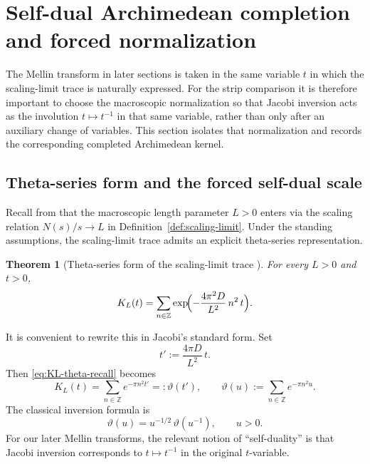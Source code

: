 \documentclass[11pt]{amsart}
\newtheorem{theorem}{Theorem}[section]
\theoremstyle{definition}
\theoremstyle{remark}
\newcommand{\Z}{\mathbb{Z}}
\begin{document}
\section{Self-dual Archimedean completion and forced normalization}
\label{sec:completion-selfdual}

The Mellin transform in later sections is taken in the same variable $t$ in which the scaling-limit
trace is naturally expressed.  For the strip comparison it is therefore important to choose the
macroscopic normalization so that Jacobi inversion acts as the involution $t\mapsto t^{-1}$ in
that same variable, rather than only after an auxiliary change of variables.  This section isolates
that normalization and records the corresponding completed Archimedean kernel.

\subsection{Theta-series form and the forced self-dual scale}

Recall from \cite{PaperI} that the macroscopic length parameter $L>0$ enters via the scaling relation
$N(s)/s\to L$ in Definition~\ref{def:scaling-limit}.  Under the standing assumptions, the
scaling-limit trace admits an explicit theta-series representation.

\begin{theorem}[Theta-series form of the scaling-limit trace {\cite[Theorem~X]{PaperI}}]
\label{thm:theta-series-form-recall}
For every $L>0$ and $t>0$,
\begin{equation}\label{eq:KL-theta-recall}
K_L(t)=\sum_{n\in\Z}\exp\!\Bigl(-\frac{4\pi^2D}{L^2}\,n^2\,t\Bigr).
\end{equation}
\end{theorem}

It is convenient to rewrite this in Jacobi's standard form.  Set
\begin{equation}\label{eq:tprime}
t' := \frac{4\pi D}{L^2}\,t.
\end{equation}
Then \eqref{eq:KL-theta-recall} becomes
\[
K_L(t)=\sum_{n\in\Z}e^{-\pi n^2 t'}=:\vartheta(t'),
\qquad
\vartheta(u):=\sum_{n\in\Z}e^{-\pi n^2 u}.
\]
The classical inversion formula is
\begin{equation}\label{eq:jacobi}
\vartheta(u)=u^{-1/2}\,\vartheta(u^{-1}),\qquad u>0.
\end{equation}
For our later Mellin transforms, the relevant notion of ``self-duality'' is that Jacobi inversion
corresponds to $t\mapsto t^{-1}$ in the original $t$-variable.
\end{document}
